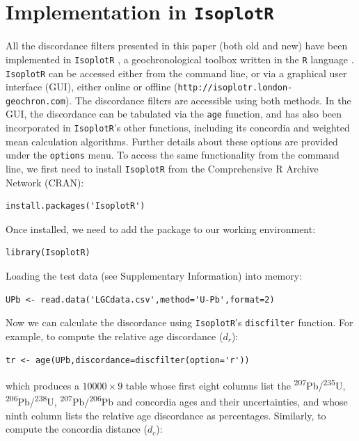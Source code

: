 \documentclass[gchron, manuscript]{copernicus}
\begin{document}
\section{Implementation in \texttt{IsoplotR}}
\label{sec:IsoplotR}

All the discordance filters presented in this paper (both old and new)
have been implemented in \texttt{IsoplotR} \citep{vermeesch2018c}, a
geochronological toolbox written in the \texttt{R} language
\citep{r2020}. \texttt{IsoplotR} can be accessed either from the
command line, or via a graphical user interface (GUI), either online
or offline (\texttt{http://isoplotr.london-geochron.com}).  The
discordance filters are accessible using both methods. In the GUI, the
discordance can be tabulated via the \texttt{age} function, and has
also been incorporated in \texttt{IsoplotR}'s other functions,
including its concordia and weighted mean calculation algorithms.
Further details about these options are provided under the
\texttt{options} menu. To access the same functionality from the
command line, we first need to install \texttt{IsoplotR} from the
Comprehensive R Archive Network (CRAN):

\begin{verbatim}
install.packages('IsoplotR')
\end{verbatim}

\noindent Once installed, we need to add the package to our working
environment:

\begin{verbatim}
library(IsoplotR)
\end{verbatim}

\noindent Loading the test data (see Supplementary Information) into
memory:

\begin{verbatim}
UPb <- read.data('LGCdata.csv',method='U-Pb',format=2)
\end{verbatim}

\noindent Now we can calculate the discordance using
\texttt{IsoplotR}'s \texttt{discfilter} function. For example, to
compute the relative age discordance ($d_r$):

\begin{verbatim}
tr <- age(UPb,discordance=discfilter(option='r'))
\end{verbatim}

\noindent which produces a ${10000}\times{9}$ table whose first eight
columns list the \textsuperscript{207}Pb/\textsuperscript{235}U,
\textsuperscript{206}Pb/\textsuperscript{238}U,
\textsuperscript{207}Pb/\textsuperscript{206}Pb and concordia ages and
their uncertainties, and whose ninth column lists the relative age
discordance as percentages. Similarly, to compute the concordia
distance ($d_c$):
\end{document}
